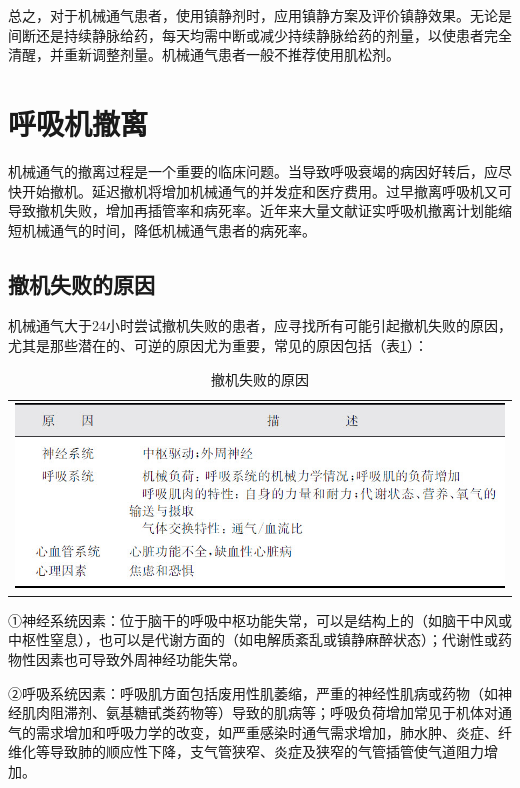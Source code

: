 总之，对于机械通气患者，使用镇静剂时，应用镇静方案及评价镇静效果。无论是间断还是持续静脉给药，每天均需中断或减少持续静脉给药的剂量，以使患者完全清醒，并重新调整剂量。机械通气患者一般不推荐使用肌松剂。

\section{呼吸机撤离}

机械通气的撤离过程是一个重要的临床问题。当导致呼吸衰竭的病因好转后，应尽快开始撤机。延迟撤机将增加机械通气的并发症和医疗费用。过早撤离呼吸机又可导致撤机失败，增加再插管率和病死率。近年来大量文献证实呼吸机撤离计划能缩短机械通气的时间，降低机械通气患者的病死率。

\subsection{撤机失败的原因}

机械通气大于24小时尝试撤机失败的患者，应寻找所有可能引起撤机失败的原因，尤其是那些潜在的、可逆的原因尤为重要，常见的原因包括（表\ref{tabapp-5}）：



\begin{longtable}{c}
  \caption{撤机失败的原因}
  \label{tabapp-5}
  \endfirsthead
  \caption[]{撤机失败的原因}
  \endhead
\includegraphics[width=\textwidth,height=\textheight,keepaspectratio]{./images/Image00303.jpg}
\end{longtable}

①神经系统因素：位于脑干的呼吸中枢功能失常，可以是结构上的（如脑干中风或中枢性窒息），也可以是代谢方面的（如电解质紊乱或镇静麻醉状态）；代谢性或药物性因素也可导致外周神经功能失常。

②呼吸系统因素：呼吸肌方面包括废用性肌萎缩，严重的神经性肌病或药物（如神经肌肉阻滞剂、氨基糖甙类药物等）导致的肌病等；呼吸负荷增加常见于机体对通气的需求增加和呼吸力学的改变，如严重感染时通气需求增加，肺水肿、炎症、纤维化等导致肺的顺应性下降，支气管狭窄、炎症及狭窄的气管插管使气道阻力增加。

